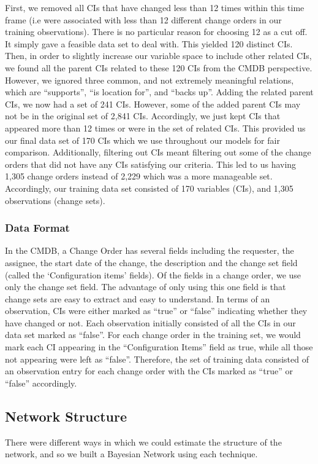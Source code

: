 \documentclass{article}
\begin{document}
First, we removed all CIs that have changed less than 12 times within this time frame  (i.e were associated with less than 12 different change orders in our
training observations). There is no particular reason for choosing 12 as a cut off. It simply gave a feasible data set to deal with. This yielded 120 distinct
CIs. Then,
in order to slightly increase our variable space to include other related CIs, we found all the parent CIs related to these 120 CIs from the CMDB perspective.
However, we ignored three common, and not extremely meaningful relations, which are  ``supports'', ``is location for'', and ``backs up''. Adding the related
parent CIs, we now had a set of 241 CIs. However, some of the added parent CIs may not be in the original set of 2,841 CIs. Accordingly, we just kept CIs that
appeared more than 12 times or were in the set of related CIs. This provided us our final data set of 170 CIs which we use throughout our models for fair
comparison. Additionally, filtering out CIs meant filtering out some of the change orders that did not have any CIs satisfying our criteria. This led to us
having 1,305 change orders instead of 2,229 which was a more manageable set. Accordingly, our training data set consisted of 170 variables (CIs), and 1,305
observations (change sets).

\subsubsection*{Data Format}
\label{sec:format}

In the CMDB, a Change Order has several fields including the requester, the assignee, the start date of the change, the description and the change set field
(called the `Configuration items' fields). Of the fields in a change order, we use only the change set field. The advantage of only using this one field is that
change sets are easy to extract and easy to understand. In terms of an observation, CIs were either marked as ``true'' or ``false'' indicating whether they
have changed or not. Each observation initially consisted of all the CIs in our data set marked as ``false''. For each change order in the training set, we
would
mark each CI appearing in the ``Configuration Items'' field as true, while all those not appearing were left as ``false''. Therefore, the set of training
data consisted of an observation entry for each change order with the CIs marked as ``true'' or ``false'' accordingly.

\subsection{Network Structure}
\label{sec:structure}
There were different ways in which we could estimate the structure of the network, and so we built a Bayesian Network using each technique.
\end{document}
